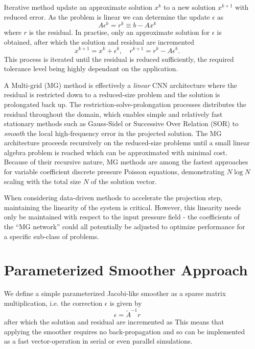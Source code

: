 \documentclass[review]{elsarticle}
\begin{document}
Iterative method update an approximate solution $x^k$ to a new solution $x^{k+1}$ with reduced error. As the problem is linear we can determine the update $\epsilon$ as
\begin{equation}
    A \epsilon^k = r^k \equiv b - Ax^k
\end{equation}
where $r$ is the residual. In practise, only an approximate solution for $\epsilon$ is obtained, after which the solution and residual are incremented
\begin{equation}
    x^{k+1} = x^k+\epsilon^k, \quad r^{k+1} = r^k-A\epsilon^k.
\end{equation}
This process is iterated until the residual is reduced sufficiently, the required tolerance level being highly dependant on the application.

A Multi-grid (MG) method is effectively a \textit{linear} CNN architecture where the residual is restricted down to a reduced-size problem and the solution is prolongated back up. The restriction-solve-prolongation processes distributes the residual throughout the domain, which enables simple and relatively fast stationary methods such as Gauss-Sidel or Successive Over Relation (SOR) to \textit{smooth} the local high-frequency error in the projected solution. The MG architecture proceeds recursively on the reduced-size problems until a small linear algebra problem is reached which can be approximated with minimal cost. Because of their recursive nature, MG methods are among the fastest approaches for variable coefficient discrete pressure Poisson equations, demonstrating $N\log N$ scaling with the total size $N$ of the solution vector.

When considering data-driven methods to accelerate the projection step, maintaining the linearity of the system is critical. However, this linearity needs only be maintained with respect to the input pressure field - the coefficients of the ``MG network'' could all potentially be adjusted to optimize performance for a specific sub-class of problems. 

\section{Parameterized Smoother Approach}

We define a simple parameterized Jacobi-like smoother as a sparse matrix multiplication, i.e. the correction $\epsilon$ is given by
\begin{equation}
    \epsilon = \tilde A^{-1}r
\end{equation}
after which the solution and residual are incremented as
This means that applying the smoother requires no back-propagation and so can be implemented as a fast vector-operation in serial or even parallel simulations.
\end{document}
